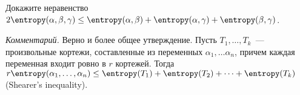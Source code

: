 Докажите неравенство $2 \entropy(\alpha, \beta, \gamma) \le \entropy(\alpha, \beta) + \entropy(\alpha, \gamma) 
+ \entropy(\beta, \gamma)$.

\textit{Комментарий.} Верно и более общее утверждение. Пусть $T_1, \dots, T_k$~--- произвольные кортежи,
составленные из переменных $\alpha_1, \dots \alpha_n$, причем каждая переменная входит ровно в $r$
кортежей. Тогда $r \entropy(\alpha_1, \dots, \alpha_n) \leq \entropy(T_1) + \entropy(T_2) + \dots +
\entropy(T_k)$ (Shearer's inequality).
